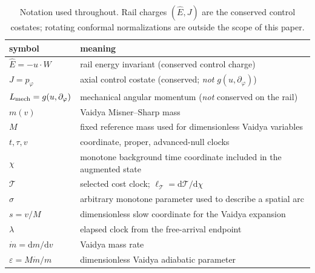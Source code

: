 \documentclass[12pt]{iopart}
\newcommand{\Ehat}{\hat E}
\newcommand{\dd}{\mathrm{d}}
\begin{document}
\begin{table}[htbp]
    \centering\small
    \caption{Notation used throughout. Rail charges $(\Ehat,J)$ are the conserved control
    costates; rotating conformal normalizations are outside the scope of this paper.}
    \label{tab:notation}
    \begin{tabular}{@{}ll@{}}
        \hline\hline
        symbol & meaning\\
        \hline
        $\Ehat=-u\cdot W$ & rail energy invariant (conserved control charge)\\
        $J=p_\varphi$ & axial control costate (conserved; \emph{not} $g(u,\partial_\varphi)$)\\
        $L_{\rm mech}=g(u,\partial_\varphi)$ & mechanical angular momentum (\emph{not} conserved on the rail)\\
        $m(v)$ & Vaidya Misner--Sharp mass\\
        $M$ & fixed reference mass used for dimensionless Vaidya variables\\
        $t,\tau,v$ & coordinate, proper, advanced-null clocks\\
        $\chi$ & monotone background time coordinate included in the augmented state\\
        $\mathcal T$ & selected cost clock; $\ell_{\mathcal T}=\dd\mathcal T/\dd\chi$\\
        $\sigma$ & arbitrary monotone parameter used to describe a spatial arc\\
        $s=v/M$ & dimensionless slow coordinate for the Vaidya expansion\\
        $\lambda$ & elapsed clock from the free-arrival endpoint\\
        $\dot m=\dd m/\dd v$ & Vaidya mass rate\\
        $\varepsilon=M\dot m/m$ & dimensionless Vaidya adiabatic parameter\\
        \hline\hline
    \end{tabular}
\end{table}
\end{document}
